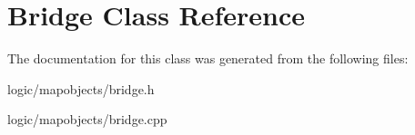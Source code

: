 \hypertarget{class_bridge}{\section{Bridge Class Reference}
\label{class_bridge}
}


The documentation for this class was generated from the following files\-:\begin{DoxyCompactItemize}
\item 
logic/mapobjects/bridge.\-h\item 
logic/mapobjects/bridge.\-cpp\end{DoxyCompactItemize}
